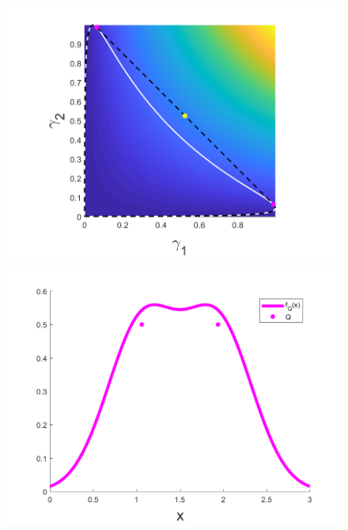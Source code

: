 
		\begin{figure}[ht]
			\centering
			\begin{minipage}{0.49\textwidth}
				\includegraphics[width = \textwidth]{gamma_likelihood_heatmap}
				\subcaption{}\label{fig:GammaSol:subfig:Gamma}
			\end{minipage}
			\begin{minipage}{0.49\textwidth}
				\includegraphics[width = \textwidth]{gamma_likelihood_heatmap_solution}
				\subcaption{}\label{fig:GammaSol:subfig:Density}
			\end{minipage}

\end{figure}
